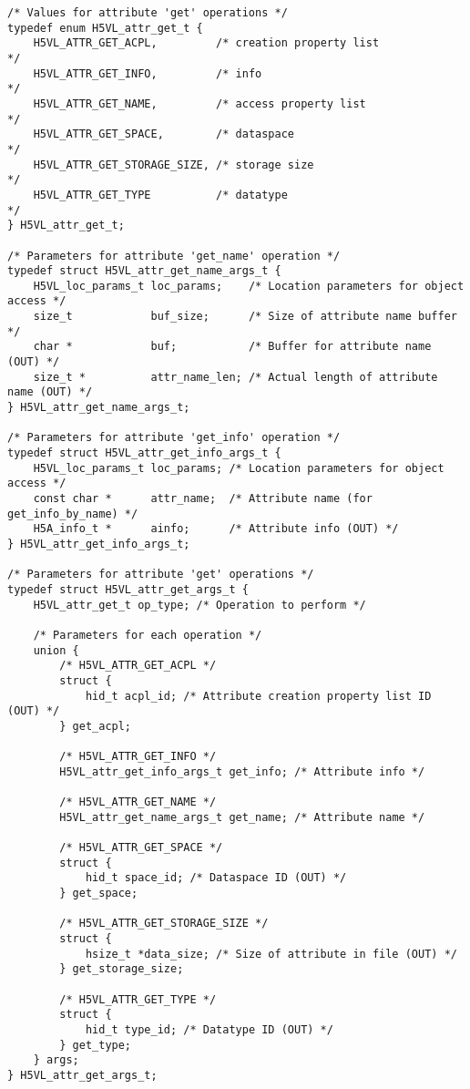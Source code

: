 \begin{lstlisting}
/* Values for attribute 'get' operations */
typedef enum H5VL_attr_get_t {
    H5VL_ATTR_GET_ACPL,         /* creation property list              */
    H5VL_ATTR_GET_INFO,         /* info                                */
    H5VL_ATTR_GET_NAME,         /* access property list                */
    H5VL_ATTR_GET_SPACE,        /* dataspace                           */
    H5VL_ATTR_GET_STORAGE_SIZE, /* storage size                        */
    H5VL_ATTR_GET_TYPE          /* datatype                            */
} H5VL_attr_get_t;

/* Parameters for attribute 'get_name' operation */
typedef struct H5VL_attr_get_name_args_t {
    H5VL_loc_params_t loc_params;    /* Location parameters for object access */
    size_t            buf_size;      /* Size of attribute name buffer */
    char *            buf;           /* Buffer for attribute name (OUT) */
    size_t *          attr_name_len; /* Actual length of attribute name (OUT) */
} H5VL_attr_get_name_args_t;

/* Parameters for attribute 'get_info' operation */
typedef struct H5VL_attr_get_info_args_t {
    H5VL_loc_params_t loc_params; /* Location parameters for object access */
    const char *      attr_name;  /* Attribute name (for get_info_by_name) */
    H5A_info_t *      ainfo;      /* Attribute info (OUT) */
} H5VL_attr_get_info_args_t;

/* Parameters for attribute 'get' operations */
typedef struct H5VL_attr_get_args_t {
    H5VL_attr_get_t op_type; /* Operation to perform */

    /* Parameters for each operation */
    union {
        /* H5VL_ATTR_GET_ACPL */
        struct {
            hid_t acpl_id; /* Attribute creation property list ID (OUT) */
        } get_acpl;

        /* H5VL_ATTR_GET_INFO */
        H5VL_attr_get_info_args_t get_info; /* Attribute info */

        /* H5VL_ATTR_GET_NAME */
        H5VL_attr_get_name_args_t get_name; /* Attribute name */

        /* H5VL_ATTR_GET_SPACE */
        struct {
            hid_t space_id; /* Dataspace ID (OUT) */
        } get_space;

        /* H5VL_ATTR_GET_STORAGE_SIZE */
        struct {
            hsize_t *data_size; /* Size of attribute in file (OUT) */
        } get_storage_size;

        /* H5VL_ATTR_GET_TYPE */
        struct {
            hid_t type_id; /* Datatype ID (OUT) */
        } get_type;
    } args;
} H5VL_attr_get_args_t;
\end{lstlisting}

